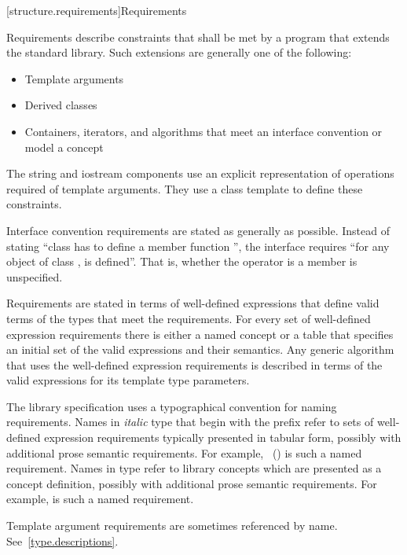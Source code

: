 [structure.requirements]{Requirements}

\pnum
{}%
Requirements describe constraints that shall be met by a \Cpp{} program that extends the standard library.
Such extensions are generally one of the following:

\begin{itemize}
\item Template arguments
\item Derived classes
\item Containers, iterators, and algorithms that meet an interface convention or
  model a concept
\end{itemize}

\pnum
The string and iostream components use an explicit representation of operations
required of template arguments. They use a class template  to
define these constraints.

\pnum
Interface convention requirements are stated as generally as possible. Instead
of stating ``class  has to define a member function '', the
interface requires ``for any object  of class ,  is
defined''. That is, whether the operator is a member is unspecified.

\pnum
Requirements are stated in terms of well-defined expressions that define valid terms of
the types that meet the requirements. For every set of well-defined expression
requirements there is either a named concept or a table that specifies an initial set of the valid expressions and
their semantics. Any generic algorithm that uses the
well-defined expression requirements is described in terms of the valid expressions for
its template type parameters.

\pnum
The library specification uses a typographical convention for naming
requirements. Names in \textit{italic} type that begin with the prefix
\oldconcept{} refer to sets of well-defined expression requirements typically
presented in tabular form, possibly with additional prose semantic requirements.
For example, ~() is such a named
requirement. Names in  type refer to library concepts
which are presented as a concept definition, possibly with additional
prose semantic requirements. For example,
is such a named requirement.

\pnum
Template argument requirements are sometimes referenced by name.
See~\ref{type.descriptions}.

